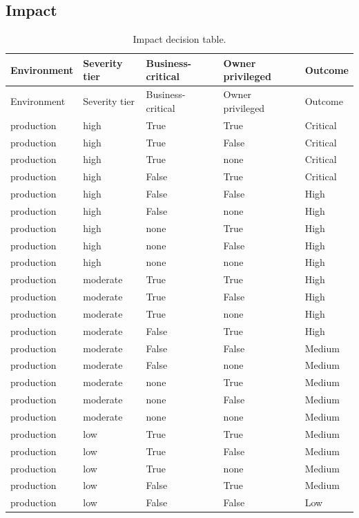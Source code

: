 \subsection{Impact}
\begin{longtable}{@{}lllll@{}}
\caption{Impact decision table.}\label{tab:dt-impact}\\
\toprule
Environment & Severity tier & Business-critical & Owner privileged & Outcome \\ \midrule
\endfirsthead
\toprule Environment & Severity tier & Business-critical & Owner privileged & Outcome \\ \midrule
\endhead
\bottomrule
\endfoot
production & high & True & True & Critical \\
production & high & True & False & Critical \\
production & high & True & none & Critical \\
production & high & False & True & Critical \\
production & high & False & False & High \\
production & high & False & none & High \\
production & high & none & True & High \\
production & high & none & False & High \\
production & high & none & none & High \\
production & moderate & True & True & High \\
production & moderate & True & False & High \\
production & moderate & True & none & High \\
production & moderate & False & True & High \\
production & moderate & False & False & Medium \\
production & moderate & False & none & Medium \\
production & moderate & none & True & Medium \\
production & moderate & none & False & Medium \\
production & moderate & none & none & Medium \\
production & low & True & True & Medium \\
production & low & True & False & Medium \\
production & low & True & none & Medium \\
production & low & False & True & Medium \\
production & low & False & False & Low \\

\end{longtable}
